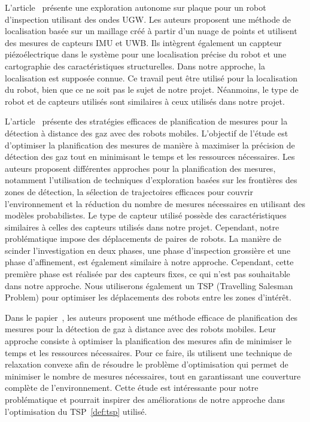 \documentclass[francais,RandD]{rapportPFE}
\begin{document}
		L'article~\cite{9568841} présente une exploration autonome sur plaque pour un robot d'inspection utilisant des ondes UGW.
		Les auteurs proposent une méthode de localisation basée sur un maillage créé à partir d'un nuage de points et utilisent des mesures de capteurs IMU et UWB.
		Ils intègrent également un cappteur piézoélectrique dans le système pour une localisation précise du robot et une cartographie des caractéristiques structurelles.
		Dans notre approche, la localisation est supposée connue.
		Ce travail peut être utilisé pour la localisation du robot, bien que ce ne soit pas le sujet de notre projet.
		Néanmoins, le type de robot et de capteurs utilisés sont similaires à ceux utilisés dans notre projet.

		L'article~\cite{7487624} présente des stratégies efficaces de planification de mesures pour la détection à distance des gaz avec des robots mobiles.
		L'objectif de l'étude est d'optimiser la planification des mesures de manière à maximiser la précision de détection des gaz tout en minimisant le temps et les ressources nécessaires.
		Les auteurs proposent différentes approches pour la planification des mesures, notamment l'utilisation de techniques d'exploration basées sur les frontières des zones de détection, la sélection de trajectoires efficaces pour couvrir l'environnement et la réduction du nombre de mesures nécessaires en utilisant des modèles probabilistes.
		Le type de capteur utilisé possède des caractéristiques similaires à celles des capteurs utilisés dans notre projet.
		Cependant, notre problématique impose des déplacements de paires de robots.
		La manière de scinder l'investigation en deux phases, une phase d'inspection grossière et une phase d'affinement, est également similaire à notre approche.
		Cependant, cette première phase est réalisée par des capteurs fixes, ce qui n'est pas souhaitable dans notre approche.
		Nous utiliserons également un TSP (Travelling Salesman Problem) pour optimiser les déplacements des robots entre les zones d'intérêt.

		Dans le papier~\cite{7139673}, les auteurs proposent une méthode efficace de planification des mesures pour la détection de gaz à distance avec des robots mobiles.
		Leur approche consiste à optimiser la planification des mesures afin de minimiser le temps et les ressources nécessaires.
		Pour ce faire, ils utilisent une technique de relaxation convexe afin de résoudre le problème d'optimisation qui permet de minimiser le nombre de mesures nécessaires, tout en garantissant une couverture complète de l'environnement.
		Cette étude est intéressante pour notre problématique et pourrait inspirer des améliorations de notre approche dans l'optimisation du TSP~\ref{def:tsp} utilisé.
\end{document}
